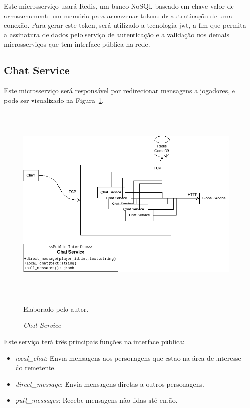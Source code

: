 Este microsserviço usará Redis, um banco NoSQL baseado em chave-valor de armazenamento em memória para armazenar tokens de autenticação de uma conexão.
%
Para gerar este token, será utilizado a tecnologia \ac{jwt}, a fim que permita a assinatura de dados pelo serviço de autenticação e a validação nos demais microsserviços que tem interface pública na rede.



\subsection{Chat Service}


Este microsserviço será responsável por redirecionar mensagens a jogadores, e pode ser visualizado na Figura~\ref{fig:chat_service}.


\begin{figure}[htb!]
  \caption{\textit{Chat Service}}
  \label{fig:chat_service}
  \includegraphics[height=10cm]{img/cap3/chat_service.png}
  \centering

  Elaborado pelo autor.
\end{figure}


Este serviço terá três principais funções na interface pública:



\begin{itemize}
  \item \textit{local\_chat}: Envia mensagens aos personagens que estão na área de interesse do remetente.
  \item \textit{direct\_message}: Envia mensagens diretas a outros personagens.
  \item \textit{pull\_messages}: Recebe mensagens não lidas até então.
\end{itemize}


